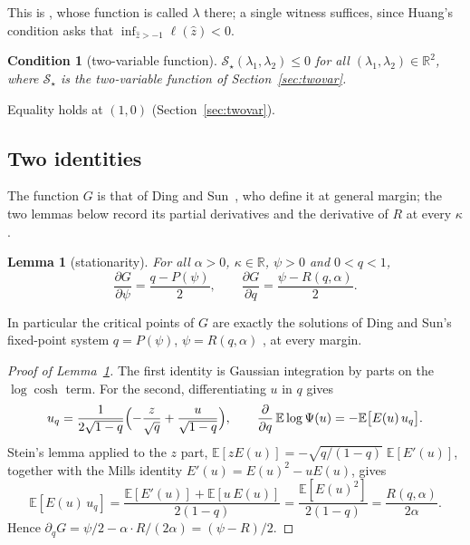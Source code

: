 \documentclass[11pt]{article}
\newtheorem{lemma}[theorem]{Lemma}
\newtheorem{cond}{Condition}
\theoremstyle{remark}
\newcommand{\E}{\mathbb{E}}
\newcommand{\R}{\mathbb{R}}
\newcommand{\sS}{\mathcal{S}}
\begin{document}
This is \cite[Condition~3.4]{huang2024capacity}, whose function is
called $\lambda$ there; a single witness suffices, since Huang's
condition asks that $\inf_{\hat z>-1}\ell(\hat z)<0$.

\begin{cond}[two-variable function]\label{cond:2var}
$\sS_\star(\lambda_1,\lambda_2)\le0$ for all
$(\lambda_1,\lambda_2)\in\R^2$, where $\sS_\star$ is the
two-variable function of Section~\ref{sec:twovar}.
\end{cond}

Equality holds at $(1,0)$ (Section~\ref{sec:twovar}).

\subsection{Two identities}\label{sec:identities}

The function $G$ is that of Ding and Sun~\cite[eq.~(4)]{ding2019capacity},
who define it at general margin; the two lemmas below record its
partial derivatives and the derivative of $R$ at every $\kappa$.

\begin{lemma}[stationarity]\label{lem:stat}
For all $\alpha>0$, $\kappa\in\R$, $\psi>0$ and $0<q<1$,
\[
\frac{\partial G}{\partial\psi}=\frac{q-P(\psi)}{2},
\qquad
\frac{\partial G}{\partial q}=\frac{\psi-R(q,\alpha)}{2}.
\]
\end{lemma}

In particular the critical points of $G$ are exactly the solutions of
Ding and Sun's fixed-point system $q=P(\psi)$, $\psi=R(q,\alpha)$
\cite{ding2019capacity}, at every margin.

\begin{proof}[Proof of Lemma~\ref{lem:stat}]
The first identity is Gaussian integration by parts on the
$\log\cosh$ term.  For the second, differentiating $u$ in $q$ gives
\[
u_q=\frac{1}{2\sqrt{1-q}}
\Bigl(-\frac{z}{\sqrt q}+\frac{u}{\sqrt{1-q}}\Bigr),
\qquad
\frac{\partial}{\partial q}\,\E\log\Psi(u)=-\E\bigl[E(u)\,u_q\bigr].
\]
Stein's lemma applied to the $z$ part,
$\E[zE(u)]=-\sqrt{q/(1-q)}\;\E[E'(u)]$, together with the Mills
identity $E'(u)=E(u)^2-uE(u)$, gives
\[
\E[E(u)\,u_q]
=\frac{\E[E'(u)]+\E[u\,E(u)]}{2(1-q)}
=\frac{\E[E(u)^2]}{2(1-q)}
=\frac{R(q,\alpha)}{2\alpha}.
\]
Hence $\partial_q G=\psi/2-\alpha\cdot R/(2\alpha)=(\psi-R)/2$.
\end{proof}
\end{document}
